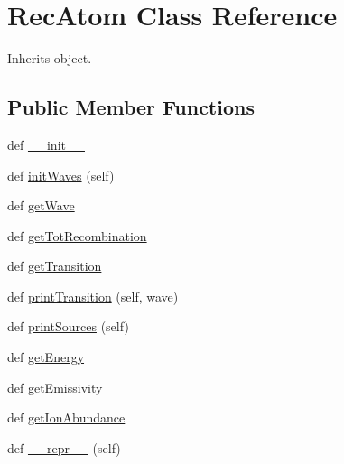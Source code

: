 \hypertarget{classpyneb_1_1core_1_1pynebcore_1_1_rec_atom}{}\section{Rec\+Atom Class Reference}
\label{classpyneb_1_1core_1_1pynebcore_1_1_rec_atom}


Inherits object.

\subsection*{Public Member Functions}
\begin{DoxyCompactItemize}
\item 
def \hyperlink{classpyneb_1_1core_1_1pynebcore_1_1_rec_atom_ac775ee34451fdfa742b318538164070e}{\+\_\+\+\_\+init\+\_\+\+\_\+}
\item 
def \hyperlink{classpyneb_1_1core_1_1pynebcore_1_1_rec_atom_aecb5df9a52e3983689ccddc2c20cc6f0}{init\+Waves} (self)
\item 
def \hyperlink{classpyneb_1_1core_1_1pynebcore_1_1_rec_atom_a70e7c07961cb65cbef72a83053ff77c4}{get\+Wave}
\item 
def \hyperlink{classpyneb_1_1core_1_1pynebcore_1_1_rec_atom_a59deba69fded8f0f17b40c917df3a09c}{get\+Tot\+Recombination}
\item 
def \hyperlink{classpyneb_1_1core_1_1pynebcore_1_1_rec_atom_acf586a33a19e340d5da3ddd7fcf84f9c}{get\+Transition}
\item 
def \hyperlink{classpyneb_1_1core_1_1pynebcore_1_1_rec_atom_a7c392bcd36d3e95a77920453058fc5af}{print\+Transition} (self, wave)
\item 
def \hyperlink{classpyneb_1_1core_1_1pynebcore_1_1_rec_atom_a8391e786a420d63ed15d4efd3f04aad5}{print\+Sources} (self)
\item 
def \hyperlink{classpyneb_1_1core_1_1pynebcore_1_1_rec_atom_a8406acc27904d955ee4dbb458f60db52}{get\+Energy}
\item 
def \hyperlink{classpyneb_1_1core_1_1pynebcore_1_1_rec_atom_aa6ddd446c1d80542fdb2fb93e5d7f1af}{get\+Emissivity}
\item 
def \hyperlink{classpyneb_1_1core_1_1pynebcore_1_1_rec_atom_a71c604d2b2dc23f3435338cdee5d68bf}{get\+Ion\+Abundance}
\item 
def \hyperlink{classpyneb_1_1core_1_1pynebcore_1_1_rec_atom_a9a47563093dfc5ba12274b66e368920c}{\+\_\+\+\_\+repr\+\_\+\+\_\+} (self)
\end{DoxyCompactItemize}
